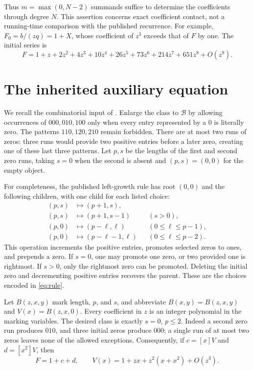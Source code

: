 \documentclass[11pt]{article}
\begin{document}
Thus $m=\max(0,N-2)$ summands suffice to determine the coefficients
through degree $N$. This assertion concerns exact coefficient contact,
not a running-time comparison with the published recurrence.
For example, $F_0=b/(zq)=1+X$, whose coefficient of $z^3$ exceeds that of
$F$ by one. The initial series is
\[
 F=1+z+2z^2+4z^3+10z^4+26z^5+73z^6+214z^7+651z^8+O(z^9).
\]

\section{The inherited auxiliary equation}

We recall the combinatorial input of \cite[Section~3.5]{BrittBeaton}.
Enlarge the class to $\mathcal B$ by allowing occurrences of $000,010,100$
only when every entry represented by a $0$ is literally zero.
The patterns $110,120,210$ remain forbidden. There are at most two
runs of zeros: three runs would provide two positive entries before
a later zero, creating one of these last three patterns.
Let $p,s$ be the lengths of the first and second zero runs, taking
$s=0$ when the second is absent and $(p,s)=(0,0)$ for the empty object.

For completeness, the published left-growth rule has root $(0,0)$ and
the following children, with one child for each listed choice:
\begin{equation}\label{eq:rule}
\begin{aligned}
 (p,s)&\longmapsto(p+1,s),\\
 (p,s)&\longmapsto(p+1,s-1) &&(s>0),\\
 (p,0)&\longmapsto(p-\ell,\ell) &&(0\le\ell\le p-1),\\
 (p,0)&\longmapsto(p-\ell-1,\ell) &&(0\le\ell\le p-2).
\end{aligned}
\end{equation}
This operation increments the positive entries, promotes selected
zeros to ones, and prepends a zero. If $s=0$, one may promote one zero,
or two provided one is rightmost. If $s>0$, only the rightmost zero
can be promoted. Deleting the initial zero and decrementing positive
entries recovers the parent. These are the choices encoded in
\eqref{eq:rule}.

Let $B(z,x,y)$ mark length, $p$, and $s$, and abbreviate
$B(x,y)=B(z,x,y)$ and $V(x)=B(z,x,0)$.
Every coefficient in $z$ is an integer polynomial in the marking
variables. The desired class is exactly $s=0$, $p\le2$.
Indeed a second zero run produces $010$, and three initial zeros
produce $000$; a single run of at most two zeros leaves none of the
allowed exceptions. Consequently, if $c=[x]V$ and $d=[x^2]V$, then
\begin{equation}\label{eq:extract}
 F=1+c+d,\qquad
 V(x)=1+zx+z^2(x+x^2)+O(z^3).
\end{equation}
\end{document}
